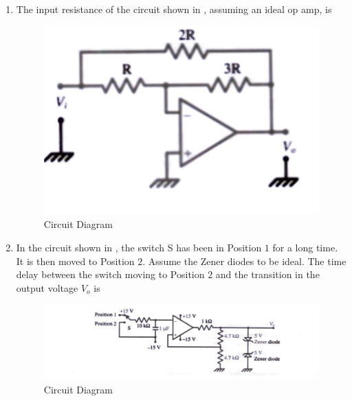 \documentclass[journal,12pt,onecolumn]{IEEEtran}
\theoremstyle{remark}
\begin{document}
\begin{enumerate}
 

\item The input resistance of the circuit shown in , assuming an ideal op amp, is \par \hfill{}
\begin{figure}[H]
    \centering
    \includegraphics[width=0.3\columnwidth]{Figs/Q-34.jpg}
    \caption{Circuit Diagram}
    \label{fig:placeholder_10}
\end{figure}
\begin{enumerate}
\end{enumerate} 

 

\item In the circuit shown in , the switch S has been in Position $1$ for a long time. It is then moved to Position $2$. Assume the Zener diodes to be ideal. The time delay between the switch moving to Position $2$ and the transition in the output voltage $V_o$ is \par \hfill{}
\begin{figure}[H]
    \centering
    \includegraphics[width=0.9\columnwidth]{Figs/Q-35.jpg}
    \caption{Circuit Diagram}
    \label{fig:placeholder_11}
\end{figure} 
\begin{enumerate}
\end{enumerate} 


\end{enumerate}
\end{document}

